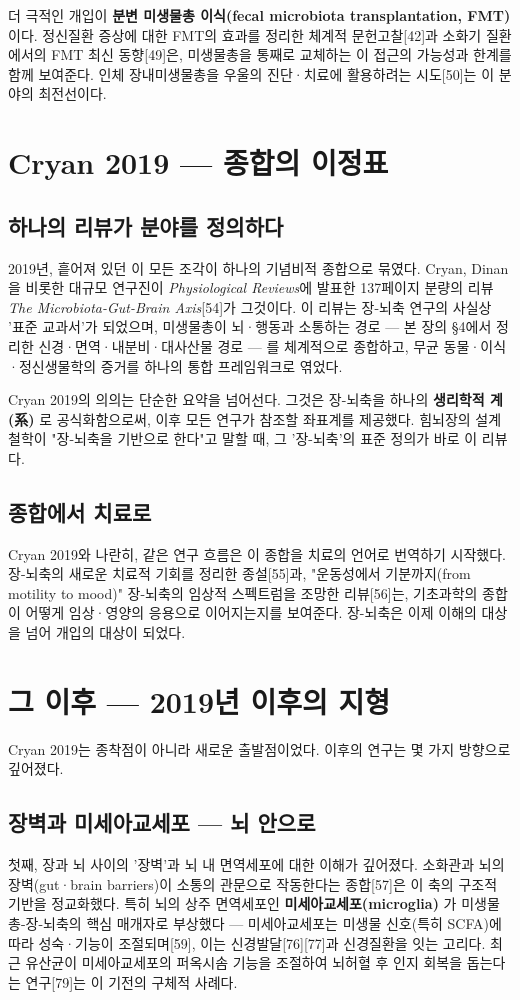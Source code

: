 \documentclass[11pt,oneside]{book}
\begin{document}
더 극적인 개입이 \textbf{분변 미생물총 이식(fecal microbiota transplantation, FMT)} 이다. 정신질환 증상에 대한 FMT의 효과를 정리한 체계적 문헌고찰[42]과 소화기 질환에서의 FMT 최신 동향[49]은, 미생물총을 통째로 교체하는 이 접근의 가능성과 한계를 함께 보여준다. 인체 장내미생물총을 우울의 진단·치료에 활용하려는 시도[50]는 이 분야의 최전선이다.

\section{Cryan 2019 — 종합의 이정표}
\subsection{하나의 리뷰가 분야를 정의하다}
2019년, 흩어져 있던 이 모든 조각이 하나의 기념비적 종합으로 묶였다. Cryan, Dinan을 비롯한 대규모 연구진이 \textit{Physiological Reviews}에 발표한 137페이지 분량의 리뷰 \textit{The Microbiota-Gut-Brain Axis}[54]가 그것이다. 이 리뷰는 장-뇌축 연구의 사실상 '표준 교과서'가 되었으며, 미생물총이 뇌·행동과 소통하는 경로 — 본 장의 §4에서 정리한 신경·면역·내분비·대사산물 경로 — 를 체계적으로 종합하고, 무균 동물·이식·정신생물학의 증거를 하나의 통합 프레임워크로 엮었다.

Cryan 2019의 의의는 단순한 요약을 넘어선다. 그것은 장-뇌축을 하나의 \textbf{생리학적 계(系)} 로 공식화함으로써, 이후 모든 연구가 참조할 좌표계를 제공했다. 힘뇌장의 설계 철학이 "장-뇌축을 기반으로 한다"고 말할 때, 그 '장-뇌축'의 표준 정의가 바로 이 리뷰다.

\subsection{종합에서 치료로}
Cryan 2019와 나란히, 같은 연구 흐름은 이 종합을 치료의 언어로 번역하기 시작했다. 장-뇌축의 새로운 치료적 기회를 정리한 종설[55]과, "운동성에서 기분까지(from motility to mood)" 장-뇌축의 임상적 스펙트럼을 조망한 리뷰[56]는, 기초과학의 종합이 어떻게 임상·영양의 응용으로 이어지는지를 보여준다. 장-뇌축은 이제 이해의 대상을 넘어 개입의 대상이 되었다.

\section{그 이후 — 2019년 이후의 지형}
Cryan 2019는 종착점이 아니라 새로운 출발점이었다. 이후의 연구는 몇 가지 방향으로 깊어졌다.

\subsection{장벽과 미세아교세포 — 뇌 안으로}
첫째, 장과 뇌 사이의 '장벽'과 뇌 내 면역세포에 대한 이해가 깊어졌다. 소화관과 뇌의 장벽(gut·brain barriers)이 소통의 관문으로 작동한다는 종합[57]은 이 축의 구조적 기반을 정교화했다. 특히 뇌의 상주 면역세포인 \textbf{미세아교세포(microglia)} 가 미생물총-장-뇌축의 핵심 매개자로 부상했다 — 미세아교세포는 미생물 신호(특히 SCFA)에 따라 성숙·기능이 조절되며[59], 이는 신경발달[76][77]과 신경질환을 잇는 고리다. 최근 유산균이 미세아교세포의 퍼옥시솜 기능을 조절하여 뇌허혈 후 인지 회복을 돕는다는 연구[79]는 이 기전의 구체적 사례다.
\end{document}
